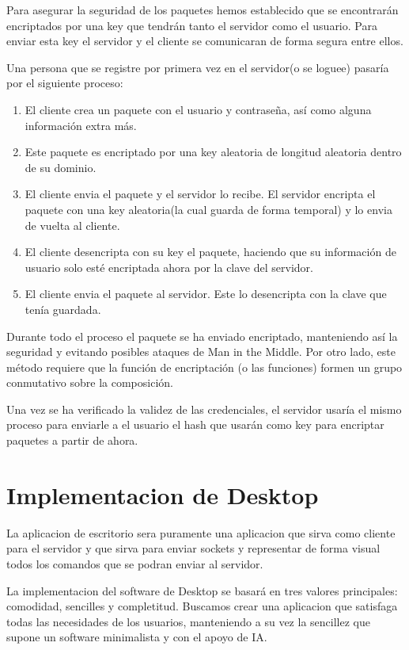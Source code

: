 \documentclass{article}
\theoremstyle{definition}
\begin{document}
Para asegurar la seguridad de los paquetes hemos establecido que se encontrarán encriptados por una key que tendrán tanto el servidor como el usuario. Para enviar esta key el servidor y el cliente se comunicaran de forma segura entre ellos. 

Una persona que se registre por primera vez en el servidor(o se loguee) pasaría por el siguiente proceso:

\begin{enumerate}
\item El cliente crea un paquete con el usuario y contraseña, así como alguna información extra más. \item Este paquete es encriptado por una key aleatoria de longitud aleatoria dentro de su dominio. 
\item El cliente envia el paquete y el servidor lo recibe. El servidor encripta el paquete con una key aleatoria(la cual guarda de forma temporal) y lo envia de vuelta al cliente.
\item El cliente desencripta con su key el paquete, haciendo que su información de usuario solo esté encriptada ahora por la clave del servidor.
\item El cliente envia el paquete al servidor. Este lo desencripta con la clave que tenía guardada.
\end{enumerate}

Durante todo el proceso el paquete se ha enviado encriptado, manteniendo así la seguridad y evitando posibles ataques de Man in the Middle. Por otro lado, este método requiere que la función de encriptación (o las funciones) formen un grupo conmutativo sobre la composición.

Una vez se ha verificado la validez de las credenciales, el servidor usaría el mismo proceso para enviarle a el usuario el hash que usarán como key para encriptar paquetes a partir de ahora.


\section{Implementacion de Desktop}

La aplicacion de escritorio sera puramente una aplicacion que sirva como cliente para el servidor y que sirva para enviar sockets y representar de forma visual todos los comandos que se podran enviar al servidor.

La implementacion del software de Desktop se basará en tres valores principales: comodidad, sencilles y completitud. Buscamos crear una aplicacion que satisfaga todas las necesidades de los usuarios, manteniendo a su vez la sencillez que supone un software minimalista y con el apoyo de IA.
\end{document}
